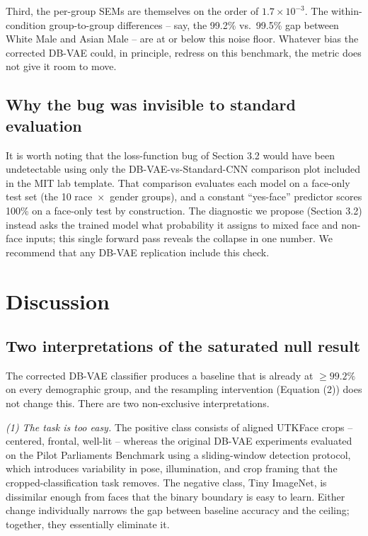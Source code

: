 \documentclass[10pt,twocolumn]{article}
\begin{document}
Third, the per-group SEMs are themselves on the order of
$1.7 \times 10^{-3}$. The within-condition group-to-group differences --
say, the 99.2\% vs.~99.5\% gap between White Male and Asian Male -- are at
or below this noise floor. Whatever bias the corrected DB-VAE could, in
principle, redress on this benchmark, the metric does not give it room to
move.

\subsection{Why the bug was invisible to standard evaluation}

It is worth noting that the loss-function bug of Section 3.2
would have been undetectable using only the DB-VAE-vs-Standard-CNN
comparison plot included in the MIT lab template. That comparison evaluates
each model on a face-only test set (the 10 race~$\times$~gender groups), and
a constant ``yes-face'' predictor scores 100\% on a face-only test by
construction. The diagnostic we propose (Section 3.2) instead
asks the trained model what probability it assigns to mixed face and
non-face inputs; this single forward pass reveals the collapse in one
number. We recommend that any DB-VAE replication include this check.

\section{Discussion}
\label{sec:discussion}

\subsection{Two interpretations of the saturated null result}

The corrected DB-VAE classifier produces a baseline that is already at
$\geq 99.2\%$ on every demographic group, and the resampling
intervention (Equation (2)) does not change this. There are two
non-exclusive interpretations.

\emph{(1) The task is too easy.} The positive class consists of aligned
UTKFace crops -- centered, frontal, well-lit -- whereas the original
DB-VAE experiments evaluated on the Pilot Parliaments Benchmark using a
sliding-window detection protocol, which introduces variability in pose,
illumination, and crop framing that the cropped-classification task
removes. The negative class, Tiny ImageNet, is dissimilar enough from
faces that the binary boundary is easy to learn. Either change
individually narrows the gap between baseline accuracy and the ceiling;
together, they essentially eliminate it.
\end{document}

